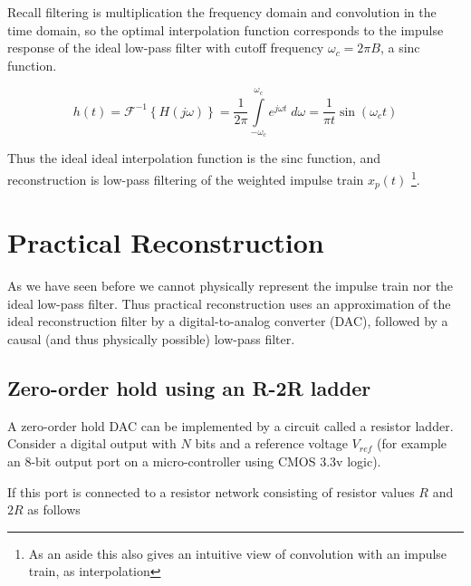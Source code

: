 Recall filtering is multiplication the frequency domain and convolution in the time domain, so the optimal interpolation function corresponds to the impulse response of the ideal low-pass filter with cutoff frequency $\omega_c = 2\pi B$, a sinc function.

\[
h(t) = \mathcal{F}^{-1} \left\{ H(j\omega) \right\} = \frac{1}{2\pi} \int\limits_{-\omega_c}^{\omega_c} e^{j\omega t} \; d\omega = \frac{1}{\pi t}\sin(\omega_c t) 
\]

Thus the ideal ideal interpolation function is the sinc function, and reconstruction is low-pass filtering of the weighted impulse train $x_p(t)$ \footnote{As an aside this also gives an intuitive view of convolution with an impulse train, as interpolation}.

\section{Practical Reconstruction}

As we have seen before we cannot physically represent the impulse train nor the ideal low-pass filter. Thus practical reconstruction uses an approximation of the ideal reconstruction filter by a digital-to-analog converter (DAC), followed by a causal (and thus physically possible) low-pass filter.

\subsection{Zero-order hold using an R-2R ladder}

A zero-order hold DAC can be implemented by a circuit called a resistor ladder. Consider a digital output with $N$ bits and a reference voltage $V_{ref}$ (for example an 8-bit output port on a micro-controller using CMOS 3.3v logic).

If this port is connected to a resistor network consisting of resistor values $R$ and $2R$ as follows

